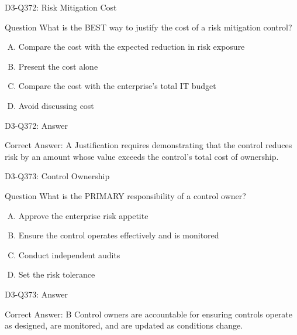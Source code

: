 \documentclass{beamer}
\begin{document}
\begin{frame}{D3-Q372: Risk Mitigation Cost}
	\begin{block}{Question}
		What is the BEST way to justify the cost of a risk mitigation control?
	\end{block}
	\begin{enumerate}[(A)]
		\item Compare the cost with the expected reduction in risk exposure
		\item Present the cost alone
		\item Compare the cost with the enterprise's total IT budget
		\item Avoid discussing cost
	\end{enumerate}
\end{frame}
\begin{frame}{D3-Q372: Answer}
	\begin{block}{Correct Answer: A}
		Justification requires demonstrating that the control reduces risk by an amount whose value exceeds the control's total cost of ownership.
	\end{block}
\end{frame}

\begin{frame}{D3-Q373: Control Ownership}
	\begin{block}{Question}
		What is the PRIMARY responsibility of a control owner?
	\end{block}
	\begin{enumerate}[(A)]
		\item Approve the enterprise risk appetite
		\item Ensure the control operates effectively and is monitored
		\item Conduct independent audits
		\item Set the risk tolerance
	\end{enumerate}
\end{frame}
\begin{frame}{D3-Q373: Answer}
	\begin{block}{Correct Answer: B}
		Control owners are accountable for ensuring controls operate as designed, are monitored, and are updated as conditions change.
	\end{block}
\end{frame}
\end{document}
